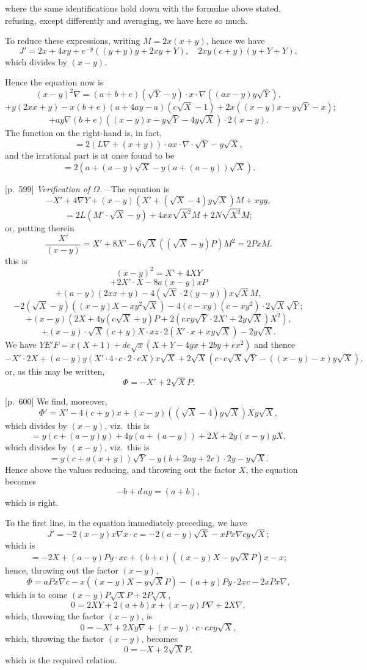 \documentclass[11pt,a4paper]{article}
\theoremstyle{plain}
\theoremstyle{definition}
\theoremstyle{remark}
\begin{document}
where the same identifications hold down with the formulae above stated, refusing, except differently and averaging, we have here so much.

To reduce these expressions, writing $M = 2x(x + y)$, hence we have
\[
J' = 2x + 4xy + e^{-y}((y + y) y + 2xy + Y), \quad 2x y(c + y)(y + Y + Y),
\]
which divides by $(x - y)$.

Hence the equation now is
\[
(x - y)^2 \nabla = (a + b + e)(\sqrt{Y} - y) \cdot x \cdot \nabla((a x - y) y \sqrt{Y}),
\]
\[
+ y(2x x + y) - x(b + e)(a + 4ay - a)(c\sqrt{X} - 1) + 2x((x - y)x - y\sqrt{Y} - x);
\]
\[
+ ay \nabla (b + e)((x - y)x - y\sqrt{Y} - 4y\sqrt{X}) \cdot 2(x - y).
\]
The function on the right-hand is, in fact,
\[
= 2(L\nabla + (x + y)) \cdot a x \cdot \nabla \cdot \sqrt{Y} - y\sqrt{X},
\]
and the irrational part is at once found to be
\[
= 2(a + (a - y)\sqrt{X} - y(a + (a - y))\sqrt{X}).
\]

\bigskip

[p.~599] \textit{Verification of $\Omega$.---}The equation is
\[
-X' + 4\nabla Y + (x - y) (X' + (\sqrt{X} - 4) y\sqrt{X}) M + xy y,
\]
\[
= 2L(M' \cdot \sqrt{X} - y) + 4xx\sqrt{X^2}M + 2N\sqrt{X^2}M;
\]
or, putting therein
\[
\frac{X'}{(x - y)} = X' + 8X' - 6\sqrt{X}((\sqrt{X} - y)P) M^2 = 2P x M.
\]
this is
\[
(x - y)^2 = X' + 4XY
\]
\[
+ 2X' \cdot X - 8a(x - y)x P
\]
\[
+ (a - y)(2x x + y) - 4(\sqrt{X} \cdot 2(y - y)) x\sqrt{X}M,
\]
\[
-2(\sqrt{X} - y)((x - y)X - xy^2 \sqrt{X}) - 4(c - x y)(c - x y^2) \cdot 2\sqrt{X}\sqrt{Y};
\]
\[
+ (x - y)(2X + 4y(c\sqrt{X} + y)P + 2(c x y\sqrt{Y} \cdot 2X' + 2y\sqrt{X})X^2),
\]
\[
+ (x - y) \cdot \sqrt{X}(c + y)X \cdot xz \cdot 2 (X' \cdot x + x y\sqrt{X}) - 2y\sqrt{X}.
\]
We have $YE'F = x(X + 1) + d e\sqrt{x}(X + Y - 4yx + 2by + ex^2)$
and thence
\[
-X' \cdot 2X + (a - y)y(X' \cdot 4 \cdot c \cdot 2 \cdot c X)x\sqrt{X} + 2\sqrt{X}(c \cdot c\sqrt{X}\sqrt{Y} - ((x - y) - x)y\sqrt{X}),
\]
or, as this may be written,
\[
\Phi = - X' + 2\sqrt{X}P.
\]

\bigskip

[p.~600] We find, moreover,
\[
\Phi' = X' - 4(c + y)x + (x - y)((\sqrt{X} - 4)y\sqrt{X})X y \sqrt{X},
\]
which divides by $(x - y)$, viz.\ this is
\[
= y(c + (a - y)y) + 4y(a + (a - y)) + 2X + 2y(x - y)yX,
\]
which divides by $(x - y)$, viz.\ this is
\[
= y(c + a(x + y))\sqrt{Y} - y(b + 2ay + 2c) \cdot 2y - y\sqrt{X}.
\]
Hence above the values reducing, and throwing out the factor $X$, the equation becomes
\[
- b + d\,a y = (a + b),
\]
which is right.

To the first line, in the equation immediately preceding, we have
\[
J' = -2(x - y)x \nabla x \cdot c = -2(a - y) \sqrt{X} - x P x \nabla c y \sqrt{X}; \]
which is
\[
= -2X + (a - y)P y \cdot xc + (b + e)((x - y)X - y\sqrt{X}P)x - x;
\]
hence, throwing out the factor $(x - y)$,
\[
\Phi = a P x \nabla c - x((x - y)X - y\sqrt{X}P) - (a + y)P y \cdot 2xc - 2 x P x \nabla,
\]
which is to come $(x - y)P\sqrt{X} P + 2 P\sqrt{X}$,
\[
0 = 2 X Y + 2(a + b)x + (x - y)P\nabla + 2 X\nabla,
\]
which, throwing the factor $(x - y)$, is
\[
0 = -X' + 2X y \nabla + (x - y) \cdot c \cdot c x y \sqrt{X},
\]
which, throwing the factor $(x - y)$, becomes
\[
0 = -X + 2\sqrt{X}P,
\]
which is the required relation.
\end{document}
